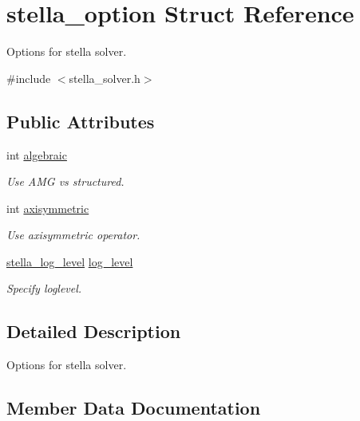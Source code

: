\hypertarget{structstella__option}{}\section{stella\+\_\+option Struct Reference}
\label{structstella__option}


Options for stella solver.  




{\ttfamily \#include $<$stella\+\_\+solver.\+h$>$}

\subsection*{Public Attributes}
\begin{DoxyCompactItemize}
\item 
int \mbox{\hyperlink{structstella__option_a7f75f868c31961c970a0013eb119ce53}{algebraic}}
\begin{DoxyCompactList}\small\item\em Use A\+MG vs structured. \end{DoxyCompactList}\item 
int \mbox{\hyperlink{structstella__option_af39b798655aad250875e43e1158e0d8b}{axisymmetric}}
\begin{DoxyCompactList}\small\item\em Use axisymmetric operator. \end{DoxyCompactList}\item 
\mbox{\hyperlink{stella__solver_8h_a6c4b3df31b9f233a9da63b147ed761d0}{stella\+\_\+log\+\_\+level}} \mbox{\hyperlink{structstella__option_a353548174d60832887cd03f7b586936a}{log\+\_\+level}}
\begin{DoxyCompactList}\small\item\em Specify loglevel. \end{DoxyCompactList}\end{DoxyCompactItemize}


\subsection{Detailed Description}
Options for stella solver. 

\subsection{Member Data Documentation}
\mbox{\label{structstella__option_a7f75f868c31961c970a0013eb119ce53}} 
